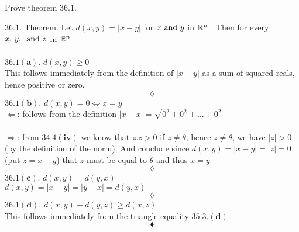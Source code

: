 \newpage


\renewcommand{\thesubsection}{\thesection.\arabic{subsection}}
\setcounter{subsection}{0}

\subsection{}
\begin{tcolorbox}
Prove theorem $\mathbf{36.1}$.
\end{tcolorbox}
$\mathbf{36.1}$. Theorem. Let $d(x,y)=|x-y|$ for $x\text{ and } y$ in $\mathbb{R}^n$ . Then for every $x,\, y,\, \text{ and } z$ in $\mathbb{R}^n$\\\\
$\mathbf{36.1( a)}$. $d(x,y)\geq 0$\\
This follows immediately from the definition of $|x-y|$ as a sum of squared reals, hence positive or zero.
$$\lozenge$$
$\mathbf{36.1( b)}$. $d(x,y)=0 \Leftrightarrow x=y$\\
$\Leftarrow$: follows from the definition $|x-x|= \sqrt{0^2+0^2+\dots + 0^2}$\\\\
$\Rightarrow$: from $\mathbf{34.4(iv)}$ we know that $z.z>0$ if $z\neq \theta$, hence $z\neq \theta$, we have $|z|>0$ (by the definition of the norm). And conclude since $d(x,y)= |x-y| = |z|=0$ (put $z=x-y$) that $z$ must be equal to $\theta$ and thus $x=y$.
$$\lozenge$$
$\mathbf{36.1( c)}$. $d(x,y)=d(y,x)$\\
$d(x,y)=|x-y|= |y-x| = d(y,x)$
$$\lozenge$$
$\mathbf{36.1( d)}$. $d(x,y)+ d(y,z)\geq d(x,z)$\\
This follows immediately from the triangle equality $\mathbf{35.3.(d)}$.
$$\blacklozenge$$\\



